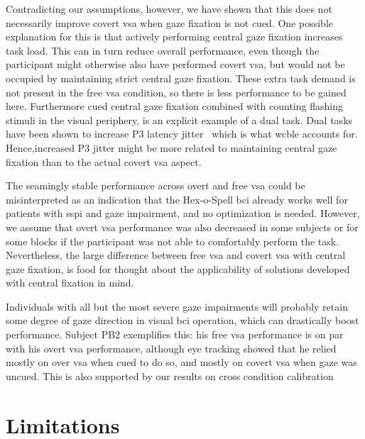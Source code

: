 Contradicting our assumptions, however, we have shown that this does not
necessarily improve covert \ac{vsa} when gaze fixation is not cued.
One possible explanation for this is that actively performing central gaze fixation
increases task load.
This can in turn reduce overall performance, even though the participant might
otherwise also have performed covert \ac{vsa}, but would not be occupied by
maintaining strict central gaze fixation.
These extra task demand is not present in the free \ac{vsa} condition, so
there is less performance to be gained here.
Furthermore cued central gaze fixation combined with counting flashing stimuli
in the visual periphery, is an explicit example of a dual task.
Dual tasks have been shown to increase P3 latency
jitter~\cite{Polich2007,Arico2014, VanDenKerchove2024}
which is what \ac{wcble} accounts for.
Hence,increased P3 jitter might be more related to maintaining central gaze fixation
than to the actual covert \ac{vsa} aspect.

The seamingly stable performance across overt and free \ac{vsa} could be
misinterpreted as an indication that the Hex-o-Spell \ac{bci} already works
well for patients with \ac{sspi} and gaze impairment, and no optimization is
needed.
However, we assume that overt \ac{vsa} performance was also decreased in some
subjects or for some blocks if the participant was not able to comfortably
perform the task.
Nevertheless, the large difference between free \ac{vsa} and covert \ac{vsa}
with central gaze fixation, is food for thought about the applicability of
solutions developed with central fixation in mind.

Individuals with all but the most severe gaze impairments will probably retain
some degree of gaze direction in visual \ac{bci} operation, which can
drastically boost performance.
Subject PB2 exemplifies this: his free \ac{vsa} performance is on par with his
overt \ac{vsa} performance, although eye tracking showed that he relied mostly
on over \ac{vsa} when cued to do so, and mostly on covert \ac{vsa} when
gaze was uncued.
This is also supported by our results on cross condition calibration


\section{Limitations}

